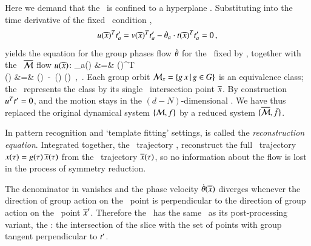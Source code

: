 \documentclass[preprint,number,sort&compress]{elsarticle}
\begin{document}
Here we demand that the \reducedsp\ is confined to a
hyperplane \slice. Substituting  into the
time derivative of the fixed \slice\ condition
,
\[
u(\overline{x})^T t'_{a} =
v(\overline{x})^T t'_{a} -
\dot{{\bf \theta}}_a \cdot
t(\overline{x})^T  t'_{a}
= 0
    \,,
\]
yields the equation for the group phases flow $\dot{{\bf \theta}}$
for the \slice\ fixed by \slicep, together with the
\reducedsp\ $\overline{\cal M}$  flow $u(\overline{x})$:
\bea
\dot{\gSpace}_a(\sspRed) &=& 
                       {\groupTan(\sspRed)^T \cdot \sliceTan{} }
\label{MFdtheta}\\
\velRed(\sspRed) &=& \vel(\sspRed)
                    \,-\, \dot{\gSpace}(\sspRed)  \cdot \groupTan(\sspRed)
    \,,\qquad\quad \sspRed \in \pSRed
\,.
\label{EqMotMFrame}
\eea
Each group orbit ${\cal M}_{x} = \{  g \, x \,|\, g
\in G \}$ is an equivalence class; the \mslices\ represents
the class by its single \slice\ intersection point $\overline{x}$.
By construction $u^T t'_{} = 0$, and  the motion
stays in the $(d\!-\!N)$-dim\-ens\-ion\-al \slice. We have
thus replaced the original dynamical system $\{{\cal M},f\}$ by a
reduced system $\{\overline{\cal M},\bar{f}\}$.

In pattern recognition and `template fitting' settings,
 is called the {\em reconstruction equation}.
Integrated together, the \reducedsp\ trajectory ,
reconstruct the full \statesp\ trajectory $x(\tau)=
g(\tau)\,\overline{x}(\tau)$ from the \reducedsp\  trajectory
$\overline{x}(\tau)$, so no information about the flow is lost in
the process of symmetry reduction.

The denominator in  vanishes and the phase
velocity $\dot{{\bf \theta}}(\overline{x})$ diverges whenever the
direction of group action on the \reducedsp\ point is
perpendicular to the direction of group action on the \slice\
point ${\overline{x}'}$. Therefore the \mslices\ has the same \sset\ as
its post-processing variant, the \mframes: the intersection of
the slice with the set of points with group tangent
perpendicular to $t'_{}$.
\end{document}

